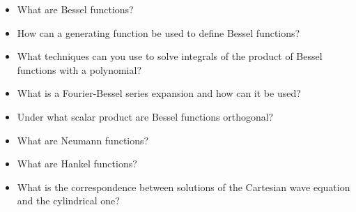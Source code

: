 \begin{itemize}
\item What are Bessel functions?  
\item How can a generating function be used to define Bessel functions?
\item What techniques can you use to solve integrals of the product of Bessel functions with a polynomial?
\item What is a Fourier-Bessel series expansion and how can it be used?
\item Under what scalar product are Bessel functions orthogonal?
\item What are Neumann functions?
\item What are Hankel functions?
\item What is the correspondence between solutions of the Cartesian wave equation and the cylindrical one?   
\end{itemize}

